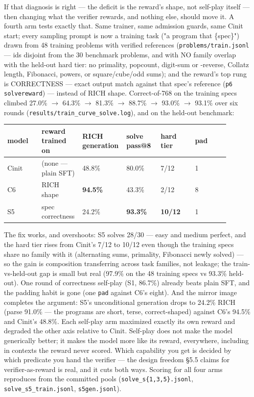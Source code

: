 \documentclass[11pt]{article}
\newcommand{\code}[1]{\texttt{#1}}
\begin{document}
If that diagnosis is right --- the deficit is the reward's shape, not self-play
itself --- then changing what the verifier rewards, and nothing else, should
move it. A fourth arm tests exactly that. Same trainer, same admission
guards, same Cinit start; every sampling prompt is now a training task
("a program that \{spec\}") drawn from 48 training problems with verified
references (\code{problems/train.jsonl} --- ids disjoint from the 30 benchmark
problems, and with NO family overlap with the held-out hard tier: no
primality, popcount, digit-sum or -reverse, Collatz length, Fibonacci,
powers, or square/cube/odd sums); and the reward's top rung is CORRECTNESS ---
exact output match against that spec's reference (\code{p6 solvereward}) --- instead
of RICH shape. Correct-of-768 on the training specs climbed 27.0\% $\rightarrow$ 64.3\% $\rightarrow$
81.3\% $\rightarrow$ 88.7\% $\rightarrow$ 93.0\% $\rightarrow$ 93.1\% over six rounds
(\code{results/train\_curve\_solve.log}), and on the held-out benchmark:

\begingroup\small
\begin{longtable}{p{0.150\linewidth} p{0.150\linewidth} p{0.150\linewidth} p{0.150\linewidth} p{0.150\linewidth} p{0.150\linewidth}}
\toprule
\textbf{model} & \textbf{reward trained on} & \textbf{RICH generation} & \textbf{solve pass@8} & \textbf{hard tier} & \textbf{pad} \\
\midrule\endhead
Cinit & (none --- plain SFT) & 48.8\% & 80.0\% & 7/12 & 1 \\
C6 & RICH shape & \textbf{94.5\%} & 43.3\% & 2/12 & 8 \\
S5 & spec correctness & 24.2\% & \textbf{93.3\%} & \textbf{10/12} & 1 \\
\bottomrule
\end{longtable}\endgroup

The fix works, and overshoots: S5 solves 28/30 --- easy and medium perfect,
and the hard tier rises from Cinit's 7/12 to 10/12 even though the training
specs share no family with it (alternating sums, primality, Fibonacci newly
solved) --- so the gain is composition transferring across task families, not
leakage; the train-vs-held-out gap is small but real (97.9\% on the 48
training specs vs 93.3\% held-out). One round of correctness self-play (S1,
86.7\%) already beats plain SFT, and the padding habit is gone (one \code{pad}
against C6's eight). And the mirror image completes the argument: S5's
unconditional generation drops to 24.2\% RICH (parse 91.0\% --- the programs are
short, terse, correct-shaped) against C6's 94.5\% and Cinit's 48.8\%. Each
self-play arm maximized exactly its own reward and degraded the other axis
relative to Cinit. Self-play does not make the model generically better; it
makes the model more like its reward, everywhere, including in contexts the
reward never scored. Which capability you get is decided by which predicate
you hand the verifier --- the design freedom \S{}5.5 claims for verifier-as-reward
is real, and it cuts both ways. Scoring for all four arms reproduces from the
committed pools (\code{solve\_s\{1,3,5\}.jsonl}, \code{solve\_s5\_train.jsonl},
\code{s5gen.jsonl}).
\end{document}
